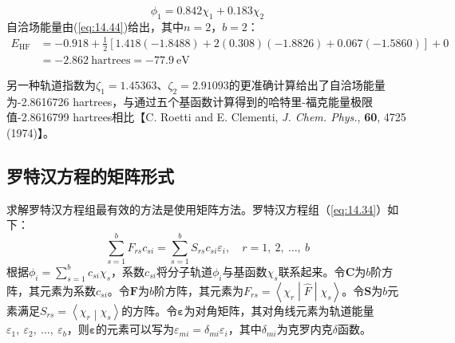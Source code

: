 \begin{examplebox}
\begin{equation*}
            \phi_1 = 0.842 \chi_1 + 0.183 \chi_2
        \end{equation*}
        自洽场能量由(\ref{eq:14.44})给出，其中$n=2$，$b=2$：
        \begin{equation*}
            \begin{aligned}
                E_{\text{HF}} &= -0.918 + \frac{1}{2} \left[1.418\left(-1.8488\right) + 2\left(0.308\right)\left(-1.8826\right) + 0.067\left(-1.5860\right)\right] + 0 \\
                &= -2.862 \: \mathrm{hartrees} = -77.9 \: \mathrm{eV}
            \end{aligned}
        \end{equation*}

        另一种轨道指数为$\zeta_1 = 1.45363$、$\zeta_2 = 2.91093$的更准确计算给出了自洽场能量为-2.8616726 hartrees，与通过五个基函数计算得到的哈特里-福克能量极限值-2.8616799 hartrees相比【C. Roetti and E. Clementi, \textit{J. Chem. Phys.}, \textbf{60}, 4725 (1974)】。
    \end{examplebox}

\subsection*{罗特汉方程的矩阵形式}

    求解罗特汉方程组最有效的方法是使用矩阵方法。罗特汉方程组（\ref{eq:14.34}）如下：
    \begin{equation*}
        \sum_{s=1}^{b} F_{rs} c_{si} = \sum_{s=1}^{b} S_{rs} c_{si} \varepsilon_i, \quad r = 1,\:2,\:\ldots,\:b
    \end{equation*}
    根据$\phi_i = \sum_{s=1}^{b} c_{si} \chi_s$，系数$c_{si}$将分子轨道$\phi_i$与基函数$\chi_s$联系起来。令$\mathbf{C}$为$b$阶方阵，其元素为系数$c_{si}$。令$\mathbf{F}$为$b$阶方阵，其元素为$F_{rs} = \left\langle \chi_r \middle| \hat{F} \middle| \chi_s \right\rangle$。令$\mathbf{S}$为$b$元素满足$S_{rs} = \left\langle \chi_r \middle| \chi_s \right\rangle$的方阵。令$\symbf{\varepsilon}$为对角矩阵，其对角线元素为轨道能量$\varepsilon_1, \: \varepsilon_2, \:\ldots,\:\varepsilon_b$，则$\symbf{\varepsilon}$的元素可以写为$\varepsilon_{mi} = \delta_{mi} \varepsilon_i$，其中$\delta_{mi}$为克罗内克$\delta$函数。

